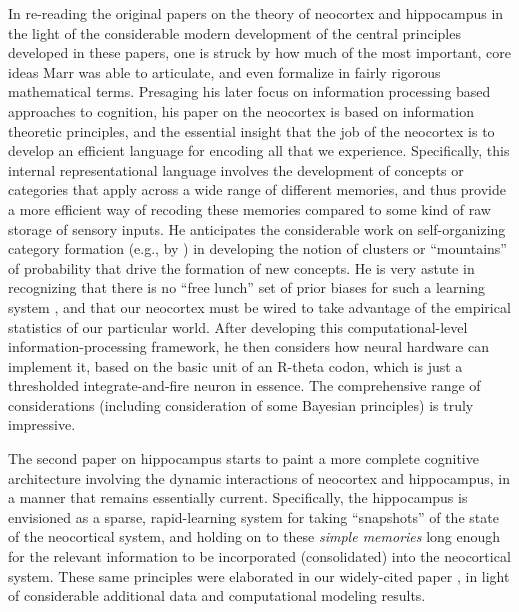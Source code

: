\documentclass[11pt,twoside]{article}
\newif\myifpdf
\begin{document}
In re-reading the original papers on the theory of neocortex \cite{Marr70} and hippocampus \cite{Marr71} in the light of the considerable modern development of the central principles developed in these papers, one is struck by how much of the most important, core ideas Marr was able to articulate, and even formalize in fairly rigorous mathematical terms.  Presaging his later focus on information processing based approaches to cognition, his paper on the neocortex is based on information theoretic principles, and the essential insight that the job of the neocortex is to develop an efficient language for encoding all that we experience.  Specifically, this internal representational language involves the development of concepts or categories that apply across a wide range of different memories, and thus provide a more efficient way of recoding these memories compared to some kind of raw storage of sensory inputs.  He anticipates the considerable work on self-organizing category formation (e.g., by ) in developing the notion of clusters or ``mountains'' of probability that drive the formation of new concepts.  He is very astute in recognizing that there is no ``free lunch'' set of prior biases for such a learning system \cite{GemanBienenstockDoursat92}, and that our neocortex must be wired to take advantage of the empirical statistics of our particular world.   After developing this computational-level information-processing framework, he then considers how neural hardware can implement it, based on the basic unit of an R-theta codon, which is just a thresholded integrate-and-fire neuron in essence.  The comprehensive range of considerations (including consideration of some Bayesian principles) is truly impressive.

The second paper on hippocampus starts to paint a more complete cognitive architecture involving the dynamic interactions of neocortex and hippocampus, in a manner that remains essentially current.  Specifically, the hippocampus is envisioned as a sparse, rapid-learning system for taking ``snapshots'' of the state of the neocortical system, and holding on to these {\em simple memories} long enough for the relevant information to be incorporated (consolidated) into the neocortical system.  These same principles were elaborated in our widely-cited paper \cite{McClellandMcNaughtonOReilly95}, in light of considerable additional data and computational modeling results.
\end{document}
